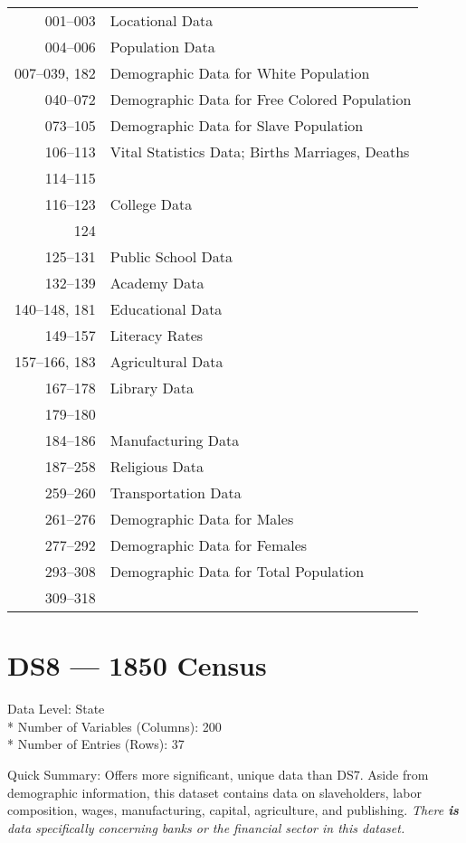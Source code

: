 ﻿\documentclass[12pt]{report}
\begin{document}
	\begin{tabular}{r|l}
		001--003 & Locational Data\\
		004--006 & Population Data\\
		007--039, 182 & Demographic Data for White Population\\
		040--072 & Demographic Data for Free Colored Population\\
		073--105 & Demographic Data for Slave Population\\
		106--113 & Vital Statistics Data; Births Marriages, Deaths\\
		114--115 & \guillemotleft~\guillemotright\\
		116--123 & College Data\\
		124 & \guillemotleft~\guillemotright\\
		125--131 & Public School Data\\
		132--139 & Academy Data\\
		140--148, 181 & Educational Data\\
		149--157 & Literacy Rates\\
		157--166, 183 & Agricultural Data\\
		167--178 & Library Data\\
		179--180 & \guillemotleft~\guillemotright\\
		184--186 & Manufacturing Data\\
		187--258 & Religious Data\\
		259--260 & Transportation Data\\
		261--276 & Demographic Data for Males\\
		277--292 & Demographic Data for Females\\
		293--308 & Demographic Data for Total Population\\
		309--318 & \guillemotleft~\guillemotright
	\end{tabular}
	\newpage

\section{DS8 --- 1850 Census}
	Data Level: State\\*
	Number of Variables (Columns): 200\\*
	Number of Entries (Rows): 37
	\vspace{1.5em}
	
	\noindent Quick Summary: Offers more significant, unique data than DS7. Aside from demographic information, this dataset contains data on slaveholders, labor composition, wages, manufacturing, capital, agriculture, and publishing. \textit{There \emph{\textbf{is}} data specifically concerning banks or the financial sector in this dataset.}
	
\end{document}
